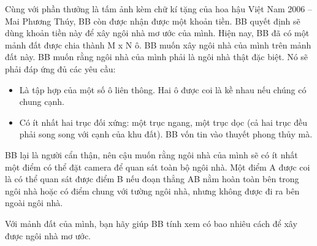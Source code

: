 Cùng với phần thưởng là tấm ảnh kèm chữ kí tặng của hoa hậu Việt Nam 2006 – Mai Phương Thúy, BB còn được nhận được một khoản tiền. BB quyết định sẽ dùng khoản tiền này để xây ngôi nhà mơ ước của mình. Hiện nay, BB đã có một mảnh đất được chia thành M x N ô. BB muốn xây ngôi nhà của mình trên mảnh đất này. BB muốn rằng ngôi nhà của mình phải là ngôi nhà thật đặc biệt. Nó sẽ phải đáp ứng đủ các yêu cầu:
\begin{itemize}
	\item Là tập hợp của một số ô liên thông. Hai ô được coi là kề nhau nếu chúng có chung cạnh.
	\item Có ít nhất hai trục đối xứng: một trục ngang, một trục dọc (cả hai trục đều phải song song với cạnh của khu đất). BB vốn tin vào thuyết phong thủy mà.
\end{itemize}

BB lại là người cẩn thận, nên cậu muốn rằng ngôi nhà của mình sẽ có ít nhất một điểm có thể đặt camera để quan sát toàn bộ ngôi nhà. Một điểm A được coi là có thể quan sát được điểm B nếu đoạn thẳng AB nằm hoàn toàn bên trong ngôi nhà hoặc có điểm chung với tường ngôi nhà, nhưng không được đi ra bên ngoài ngôi nhà.

Với mảnh đất của mình, bạn hãy giúp BB tính xem có bao nhiêu cách để xây được ngôi nhà mơ ước.